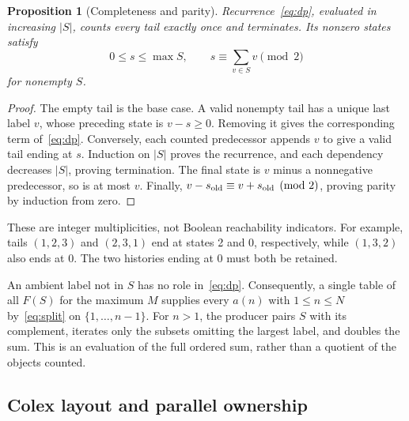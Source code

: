 \documentclass[11pt]{article}
\newtheorem{proposition}[theorem]{Proposition}
\theoremstyle{definition}
\theoremstyle{remark}
\begin{document}
\begin{proposition}[Completeness and parity]
\label{prop:dp}
Recurrence~\eqref{eq:dp}, evaluated in increasing $|S|$, counts every
tail exactly once and terminates. Its nonzero states satisfy
\begin{equation}
 0\leq s\leq\max S,\qquad s\equiv\sum_{v\in S}v\pmod2
 \label{eq:parity}
\end{equation}
for nonempty $S$.
\end{proposition}
\begin{proof}
The empty tail is the base case. A valid nonempty tail has a unique last
label $v$, whose preceding state is $v-s\geq0$. Removing it gives the
corresponding term of~\eqref{eq:dp}. Conversely, each counted predecessor
appends $v$ to give a valid tail ending at $s$. Induction on $|S|$ proves
the recurrence, and each dependency decreases $|S|$, proving termination.
The final state is $v$ minus a nonnegative predecessor, so is at most $v$.
Finally, $v-s_{\rm old}\equiv v+s_{\rm old}\pmod2$, proving parity by
induction from zero.
\end{proof}

These are integer multiplicities, not Boolean reachability indicators.
For example, tails $(1,2,3)$ and $(2,3,1)$ end at states 2 and 0,
respectively, while $(1,3,2)$ also ends at 0. The two histories ending at
0 must both be retained.

An ambient label not in $S$ has no role in~\eqref{eq:dp}. Consequently,
a single table of all $F(S)$ for the maximum $M$ supplies every
$a(n)$ with $1\leq n\leq N$ by~\eqref{eq:split} on
$\{1,\ldots,n-1\}$. For $n>1$, the producer pairs $S$ with its complement,
iterates only the subsets omitting the largest label, and doubles the sum.
This is an evaluation of the full ordered sum, rather than a quotient of
the objects counted.

\subsection{Colex layout and parallel ownership}
\end{document}
